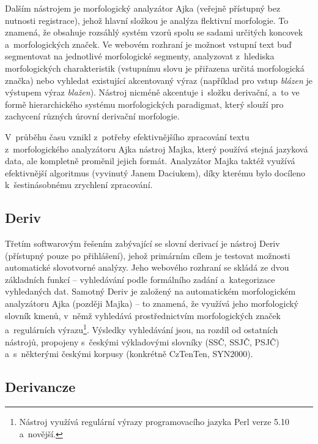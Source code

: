 Dalším nástrojem je morfologický analyzátor Ajka (veřejně přístupný bez
nutnosti registrace), jehož hlavní složkou je analýza flektivní
morfologie. To znamená, že obsahuje rozsáhlý systém vzorů spolu se
sadami určitých koncovek a~morfologických značek. Ve webovém rozhraní je
možnost vstupní text buď segmentovat na jednotlivé morfologické
segmenty, analyzovat z~hlediska morfologických charakteristik (vstupnímu
slovu je přiřazena určitá morfologická značka) nebo vyhledat existující
akcentovaný výraz (například pro vstup \emph{blázen} je výstupem výraz
\emph{blažen}). Nástroj nicméně akcentuje i~složku derivační, a~to ve
formě hierarchického systému morfologických paradigmat, který slouží pro
zachycení různých úrovní derivační morfologie.~\parencite{ajka}

V~průběhu času vznikl z~potřeby efektivnějšího zpracování textu
z~morfologického analyzátoru Ajka nástroj Majka, který používá stejná
jazyková data, ale kompletně proměnil jejich formát. Analyzátor Majka
taktéž využívá efektivnější algoritmus (vyvinutý Janem Daciukem), díky
kterému bylo docíleno k~šestinásobnému zrychlení zpracování.
\parencite{majka}

\hypertarget{deriv}{%
\subsection{Deriv}\label{deriv}}

Třetím softwarovým řešením zabývající se slovní derivací je nástroj
Deriv (přístupný pouze po přihlášení), jehož primárním cílem je testovat
možnosti automatické slovotvorné analýzy. Jeho webového rozhraní se
skládá ze dvou základních funkcí -- vyhledávání podle formálního zadání
a~kategorizace vyhledaných dat. Samotný Deriv je založený na
automatickém morfologickém analyzátoru Ajka (později Majka) -- to
znamená, že využívá jeho morfologický slovník kmenů, v~němž vyhledává
prostřednictvím morfologických značek a~regulárních
výrazu\footnote{Nástroj využívá regulární výrazy programovacího jazyka Perl verze 5.10 a~novější.}.
Výsledky vyhledávání jsou, na rozdíl od ostatních nástrojů, propojeny
s~českými výkladovými slovníky (SSČ, SSJČ, PSJČ) a~s~některými českými
korpusy (konkrétně CzTenTen, SYN2000).~\parencite{deriv}

\hypertarget{derivancze}{%
\subsection{Derivancze}\label{derivancze}}

